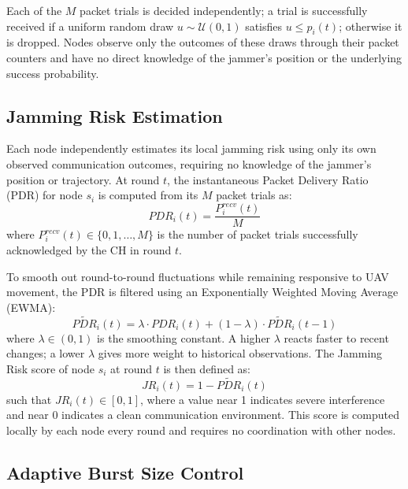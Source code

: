 \documentclass[conference]{IEEEtran}
\begin{document}
Each of the $M$ packet trials is decided independently; a trial is
successfully received if a uniform random draw $u \sim \mathcal{U}(0,1)$
satisfies $u \leq p_i(t)$; otherwise it is dropped. Nodes observe only
the outcomes of these draws through their packet counters and have no
direct knowledge of the jammer's position or the underlying success
probability.

\subsection{Jamming Risk Estimation}

Each node independently estimates its local jamming risk using only its
own observed communication outcomes, requiring no knowledge of the
jammer's position or trajectory. At round $t$, the instantaneous Packet
Delivery Ratio (PDR) for node $s_i$ is computed from its $M$
packet trials as:
\begin{equation}
    PDR_i(t) = \frac{P^{recv}_{i}(t)}{M}
\end{equation}
where $P^{recv}_{i}(t) \in \{0, 1, \ldots, M\}$ is the number of
packet trials successfully acknowledged by the CH in round $t$.

To smooth out round-to-round fluctuations while remaining responsive to
UAV movement, the PDR is filtered using an Exponentially Weighted Moving
Average (EWMA):
\begin{equation}
    \widetilde{PDR}_i(t) = \lambda \cdot PDR_i(t) + (1 - \lambda) \cdot \widetilde{PDR}_i(t-1)
\end{equation}
where $\lambda \in (0,1)$ is the smoothing constant. A higher $\lambda$
reacts faster to recent changes; a lower $\lambda$ gives more weight to
historical observations. The Jamming Risk score of node $s_i$ at round
$t$ is then defined as:
\begin{equation}
    JR_i(t) = 1 - \widetilde{PDR}_i(t)
\end{equation}
such that $JR_i(t) \in [0,1]$, where a value near 1 indicates severe
interference and near 0 indicates a clean communication environment.
This score is computed locally by each node every round and requires no
coordination with other nodes.

\subsection{Adaptive Burst Size Control}
\end{document}
